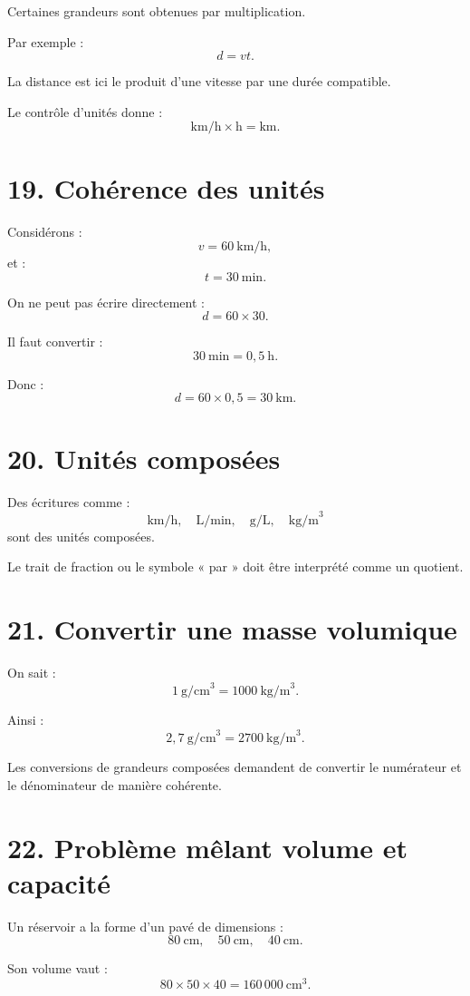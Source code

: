 Certaines grandeurs sont obtenues par multiplication.

Par exemple :
\[
d=vt.
\]

La distance est ici le produit d'une vitesse par une durée compatible.

Le contrôle d'unités donne :
\[
\text{km/h}\times\text{h}=\text{km}.
\]

\section{19. Cohérence des unités}

Considérons :
\[
v=60\ \text{km/h},
\]
et :
\[
t=30\ \text{min}.
\]

On ne peut pas écrire directement :
\[
d=60\times30.
\]

Il faut convertir :
\[
30\ \text{min}=0{,}5\ \text{h}.
\]

Donc :
\[
d=60\times0{,}5=30\ \text{km}.
\]

\section{20. Unités composées}

Des écritures comme :
\[
\text{km/h},
\quad
\text{L/min},
\quad
\text{g/L},
\quad
\text{kg/m}^3
\]
sont des unités composées.

Le trait de fraction ou le symbole « par » doit être interprété comme un quotient.

\section{21. Convertir une masse volumique}

On sait :
\[
1\ \text{g/cm}^3=1000\ \text{kg/m}^3.
\]

Ainsi :
\[
2{,}7\ \text{g/cm}^3
=
2700\ \text{kg/m}^3.
\]

Les conversions de grandeurs composées demandent de convertir le numérateur et le dénominateur de manière cohérente.

\section{22. Problème mêlant volume et capacité}

Un réservoir a la forme d'un pavé de dimensions :
\[
80\ \text{cm},
\quad
50\ \text{cm},
\quad
40\ \text{cm}.
\]

Son volume vaut :
\[
80\times50\times40=160\,000\ \text{cm}^3.
\]

